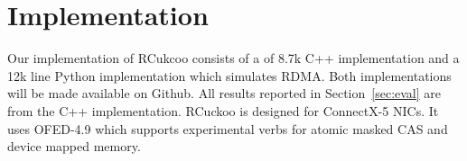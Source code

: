\section{Implementation}

Our implementation of RCukcoo consists of a of 8.7k C++ implementation and a 12k line Python
implementation which simulates RDMA. Both implementations will be made available on Github.  All
results reported in Section~\ref{sec:eval} are from the C++ implementation.  RCuckoo is designed for
ConnectX-5 NICs. It uses OFED-4.9 which supports experimental verbs for atomic masked CAS and device
mapped memory. 
